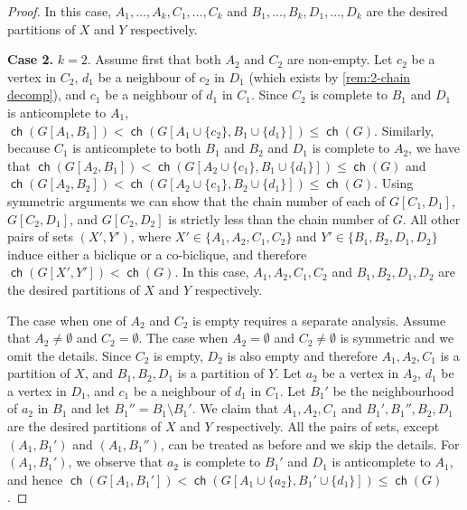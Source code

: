 \documentclass{article}
\DeclareMathOperator\ch{\mathsf{ch}}
\begin{document}
\begin{proof}
	In this case, $A_1, \ldots, A_k, C_1, \ldots, C_k$ and $B_1, \ldots, B_k, D_1, \ldots, D_k$ are the desired partitions of $X$ and $Y$ respectively.
	
	
	\textbf{Case 2.} $k = 2$. Assume first that both $A_2$ and $C_2$ are non-empty.
	Let $c_2$ be a vertex in $C_2$, $d_1$ be a neighbour of $c_2$ in $D_1$ (which exists by \cref{rem:2-chain decomp}), and $c_1$
	be a neighbour of $d_1$ in $C_1$. Since $C_2$ is complete to $B_1$ and $D_1$ is
	anticomplete to $A_1$, $\ch(G[A_1,B_1]) < \ch(G[A_1 \cup \{ c_2 \}, B_1 \cup \{d_1\}]) \leq \ch(G)$.
	Similarly, because $C_1$ is anticomplete to both $B_1$ and $B_2$ and $D_1$ is complete to $A_2$,
	we have that $\ch(G[A_2,B_1]) < \ch(G[A_2 \cup \{ c_1 \}, B_1 \cup \{d_1\}]) \leq \ch(G)$
	and $\ch(G[A_2,B_2]) < \ch(G[A_2 \cup \{ c_1 \}, B_2 \cup \{d_1\}]) \leq \ch(G)$.
	Using symmetric arguments we can show that the chain number of each of 
	$G[C_1,D_1]$, $G[C_2,D_1]$, and $G[C_2,D_2]$ is strictly less than the chain number of
	$G$. All other pairs of sets $(X',Y')$, where $X' \in \{ A_1, A_2, C_1, C_2 \}$ and $Y' \in \{ B_1, B_2, D_1, D_2 \}$
	induce either a biclique or a co-biclique, and therefore $\ch(G[X',Y']) < \ch(G)$. In this case, $A_1, A_2, C_1, C_2$ and $B_1, B_2, D_1, D_2$ are the desired partitions of $X$ and $Y$ respectively.
	
	The case when one of $A_2$ and $C_2$ is empty requires a separate analysis. Assume that $A_2 \neq \emptyset$ 
	and $C_2 = \emptyset$. The  case when $A_2 = \emptyset$ and $C_2 \neq \emptyset$ is symmetric 
	and we omit the details.
	Since $C_2$ is empty, $D_2$ is also empty and therefore $A_1, A_2, C_1$ is a partition of $X$,
	and $B_1, B_2, D_1$ is a partition of $Y$. Let $a_2$ be a vertex in $A_2$, $d_1$ be a vertex in $D_1$,
	and $c_1$ be a neighbour of $d_1$ in $C_1$. Let $B_1'$ be the neighbourhood of $a_2$ in $B_1$ and
	let $B_1'' = B_1 \setminus B_1'$. We claim that  $A_1, A_2, C_1$ and $B_1', B_1'', B_2, D_1$
	are the desired partitions of $X$ and $Y$ respectively. 
	All the pairs of sets,
	except $(A_1, B_1')$ and $(A_1, B_1'')$, can be treated as before and we skip the details.
	For $(A_1, B_1')$, we observe that $a_2$ is complete to $B_1'$ and $D_1$ is anticomplete to $A_1$,
	and hence $\ch(G[A_1,B_1']) < \ch(G[A_1 \cup \{ a_2 \}, B_1' \cup \{d_1\}]) \leq \ch(G)$.
	

\end{proof}
\end{document}
